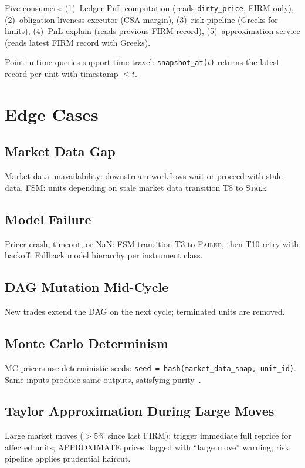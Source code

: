 \documentclass[11pt,a4paper]{article}
\begin{document}
Five consumers: (1)~Ledger PnL computation (reads \texttt{dirty\_price}, FIRM only), (2)~obligation-liveness executor (CSA margin), (3)~risk pipeline (Greeks for limits), (4)~PnL explain (reads previous FIRM record), (5)~approximation service (reads latest FIRM record with Greeks).

Point-in-time queries support time travel: \texttt{snapshot\_at($t$)} returns the latest record per unit with timestamp $\leq t$.

\clearpage
\section{Edge Cases}
\label{sec:edge-cases}

\subsection{Market Data Gap}
Market data unavailability: downstream workflows wait or proceed with stale data.  FSM: units depending on stale market data transition T8 to \textsc{Stale}.

\subsection{Model Failure}
Pricer crash, timeout, or NaN: FSM transition T3 to \textsc{Failed}, then T10 retry with backoff.  Fallback model hierarchy per instrument class.

\subsection{DAG Mutation Mid-Cycle}
New trades extend the DAG on the next cycle; terminated units are removed.

\subsection{Monte Carlo Determinism}
MC pricers use deterministic seeds: \texttt{seed = hash(market\_data\_snap, unit\_id)}.  Same inputs produce same outputs, satisfying purity~\cite[\S7.7]{ledger}.

\subsection{Taylor Approximation During Large Moves}
Large market moves ($>5\%$ since last FIRM): trigger immediate full reprice for affected units; APPROXIMATE prices flagged with ``large move'' warning; risk pipeline applies prudential haircut.
\end{document}
